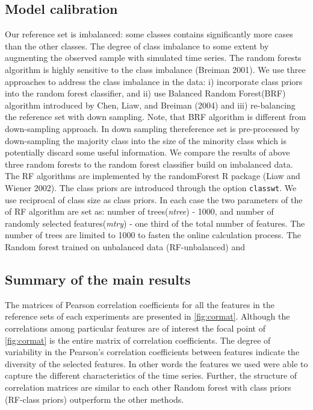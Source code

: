 \documentclass[11pt,]{article}
\theoremstyle{definition}
\theoremstyle{definition}
\theoremstyle{definition}
\theoremstyle{remark}
\begin{document}
\newpage

\subsection{Model calibration}\label{model-calibration}

Our reference set is imbalanced: some classes contains significantly
more cases than the other classes. The degree of class imbalance to some
extent by augmenting the observed sample with simulated time series. The
random forests algorithm is highly sensitive to the class imbalance
(Breiman 2001). We use three approaches to address the class imbalance
in the data: i) incorporate class priors into the random forest
classifier, and ii) use Balanced Random Forest(BRF) algorithm introduced
by Chen, Liaw, and Breiman (2004) and iii) re-balancing the reference
set with down sampling. Note, that BRF algorithm is different from
down-sampling approach. In down sampling thereference set is
pre-processed by down-sampling the majority class into the size of the
minority class which is potentially discard some useful information. We
compare the results of above three random forests to the random forest
classifier build on imbalanced data. The RF algorithms are implemented
by the randomForest R package (Liaw and Wiener 2002). The class priors
are introduced through the option \texttt{classwt}. We use reciprocal of
class size as class priors. In each case the two parameters of the of RF
algorithm are set as: number of trees(\emph{ntree}) - 1000, and number
of randomly selected features(\emph{mtry}) - one third of the total
number of features. The number of trees are limited to 1000 to fasten
the online calculation process. The Random forest trained on unbalanced
data (RF-unbalanced) and

\subsection{Summary of the main
results}\label{summary-of-the-main-results}

\label{sec:results}

The matrices of Pearson correlation coefficients for all the features in
the reference sets of each experiments are presented in
\autoref{fig:cormat}. Although the correlations among particular
features are of interest the focal point of \autoref{fig:cormat} is the
entire matrix of correlation coefficients. The degree of variability in
the Pearson's correlation coefficients between features indicate the
diversity of the selected features. In other words the features we used
were able to capture the different characteristics of the time series.
Further, the structure of correlation matrices are similar to each other
Random forest with class priors (RF-class priors) outperform the other
methods.
\end{document}
